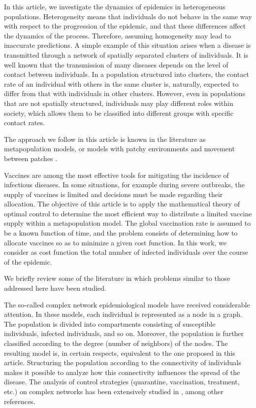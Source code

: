 \documentclass[a4paper,10pt]{article}
\theoremstyle{remark}
\begin{document}
In this article, we investigate the dynamics of epidemics in heterogeneous populations. Heterogeneity means that individuals do not behave in the same way with respect to the progression of the epidemic, and that these differences affect the dynamics of the process. Therefore, assuming homogeneity may lead to inaccurate predictions. A simple example of this situation arises when a disease is transmitted through a network of spatially separated clusters of individuals. It is well known that the transmission of many diseases depends on the level of contact between individuals. In a population structured into clusters, the contact rate of an individual with others in the same cluster is, naturally, expected to differ from that with individuals in other clusters. However, even in populations that are not spatially structured, individuals may play different roles within society, which allows them to be classified into different groups with specific contact rates.

The approach we follow in this article is known in the literature as metapopulation models, or models with patchy environments and movement between patches \cite{FredBrauer482, IstvanZ.Kiss1563, Nowzari2016}.



Vaccines are among the most effective tools for mitigating the incidence of infectious diseases. In some situations, for example during severe outbreaks, the supply of vaccines is limited and decisions must be made regarding their allocation. The objective of this article is to apply the mathematical theory of optimal control to determine the most efficient way to distribute a limited vaccine supply within a metapopulation model. The global vaccination rate is assumed to be a known function of time, and the problem consists of determining how to allocate vaccines so as to minimize a given cost function. In this work, we consider as cost function the total number of infected individuals over the course of the epidemic.

We briefly review some of the literature in which problems similar to those addressed here have been studied.

The so-called complex network epidemiological models \cite{Pastor-Satorras2001,Pastor-Satorras2001b} have received considerable attention. In these models, each individual is represented as a node in a graph. The population is divided into compartments consisting of susceptible individuals, infected individuals, and so on. Moreover, the population is further classified according to the degree (number of neighbors) of the nodes. The resulting model is, in certain respects, equivalent to the one proposed in this article. Structuring the population according to the connectivity of individuals makes it possible to analyze how this connectivity influences the spread of the disease. The analysis of control strategies (quarantine, vaccination, treatment, etc.) on complex networks has been extensively studied in \cite{KANG20173945,Esquivel-Gomez2018,Strona2018,Pastor-Satorras2002,Kalisky2004,Nowzari2016}, among other references.
\end{document}
